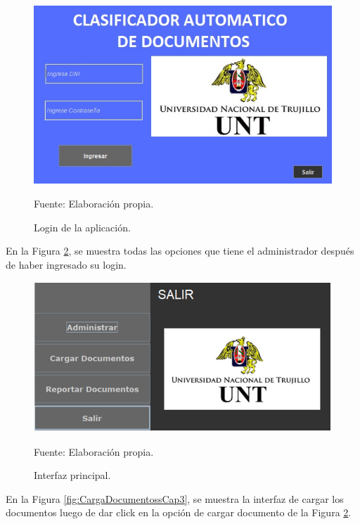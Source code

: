 \begin{figure}[h!]
	\centering
		\includegraphics[scale=0.43]{imagenes/interfazApp.jpeg}
		\caption{Login de la aplicación.}
		\begin{center}
    Fuente: Elaboración propia.
    \end{center}
	\label{fig:InterfazAppCap3}
\end{figure}

\newpage
En la Figura \ref{fig:OpcionesAppCap3}, se muestra todas las opciones que tiene el administrador después de haber ingresado su login.

\begin{figure}[h!]
	\centering
		\includegraphics[scale=0.55]{imagenes/OpcionesApp.png}
		\caption{Interfaz principal.}
		\begin{center}
    Fuente: Elaboración propia.
    \end{center}
	\label{fig:OpcionesAppCap3}
\end{figure}
\newpage
En la Figura \ref{fig:CargaDocumentossCap3}, se muestra la interfaz de cargar los documentos luego de dar click en la opción de cargar documento de la Figura \ref{fig:OpcionesAppCap3}.

